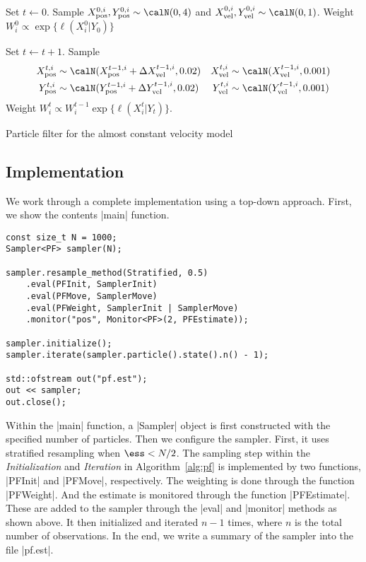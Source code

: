 \begin{algorithm}[t]
  \begin{algorithmic}
    \tophrule
    \STATE {}
    \STATE Set $t\leftarrow0$.
    \STATE Sample $\xpos^{0,i},\ypos^{0,i}\sim\calN(0,4)$ and
    $\xvel^{0,i},\yvel^{0,i}\sim\calN(0,1)$.
    \STATE Weight $W_i^0 \propto \exp\{\ell(X_i^0 \vert Y_0)\}$

    \REPEAT
    \STATE {}
    \STATE Set $t\leftarrow t + 1$.
    \STATE Sample
    \begin{align*}
      \xpos^{t,i}&\sim\calN(\xpos^{t-1,i} + \Delta\xvel^{t-1,i}, 0.02) &
      \xvel^{t,i}&\sim\calN(\xvel^{t-1,i}, 0.001) \\
      \ypos^{t,i}&\sim\calN(\ypos^{t-1,i} + \Delta\yvel^{t-1,i}, 0.02) &
      \yvel^{t,i}&\sim\calN(\yvel^{t-1,i}, 0.001)
    \end{align*}
    \STATE Weight $W_i^t \propto W_i^{t - 1}\exp\{\ell(X_i^t \vert Y_t)\}$.
    \bottomhrule
  \end{algorithmic}
  \caption{Particle filter for the almost constant velocity model}
  \label{alg:pf}
\end{algorithm}

\subsection{Implementation}
\label{sub:Implementation (PF)}

We work through a complete implementation using a top-down approach. First, we
show the contents |main| function.
\begin{verbatim}
const size_t N = 1000;
Sampler<PF> sampler(N);

sampler.resample_method(Stratified, 0.5)
    .eval(PFInit, SamplerInit)
    .eval(PFMove, SamplerMove)
    .eval(PFWeight, SamplerInit | SamplerMove)
    .monitor("pos", Monitor<PF>(2, PFEstimate));

sampler.initialize();
sampler.iterate(sampler.particle().state().n() - 1);

std::ofstream out("pf.est");
out << sampler;
out.close();
\end{verbatim}
Within the |main| function, a |Sampler| object is first constructed with the
specified number of particles. Then we configure the sampler. First, it  uses
stratified resampling when $\ess < N / 2$. The sampling step within the
\emph{Initialization} and \emph{Iteration} in Algorithm~\ref{alg:pf} is
implemented by two functions, |PFInit| and |PFMove|, respectively. The
weighting is done through the function |PFWeight|. And the estimate is
monitored through the function |PFEstimate|. These are added to the sampler
through the |eval| and |monitor| methods as shown above. It then initialized
and iterated $n - 1$ times, where $n$ is the total number of observations. In
the end, we write a summary of the sampler into the file |pf.est|.

